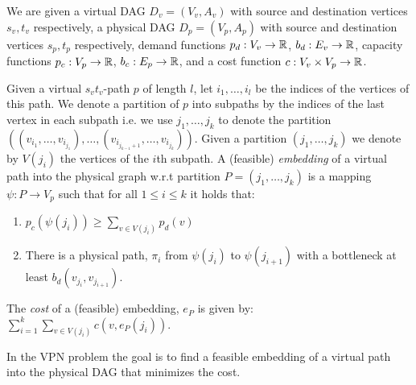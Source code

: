 We are given a virtual DAG $D_v = (V_v, A_v)$ 
with source and destination vertices $s_v, t_v$ respectively, 
a physical DAG $D_p = (V_p, A_p)$
with source and destination vertices $s_p, t_p$ respectively,
demand functions $p_d : V_v \to \mathbb{R}$, $b_d : E_v \to \mathbb{R}$,
capacity functions $p_c : V_p \to \mathbb{R}$, $b_c : E_p \to \mathbb{R}$,
and a cost function $c: V_v \times V_p \to \mathbb{R}$. 

Given a virtual $s_vt_v$-path $p$ of length $l$,
let $i_1, \ldots, i_l$ be the indices of the vertices of this path.
We denote a partition of $p$ into subpaths by the indices of the last vertex in
each subpath i.e. we use $j_1, \ldots, j_k$ to denote the partition 
$((v_{i_1}, \ldots, v_{i_{j_1}}), \ldots, (v_{i_{j_{k-1} + 1}}, \ldots,
v_{i_{j_k}}))$.
Given a partition $(j_1, \ldots, j_k)$ we denote by $V(j_i)$ the vertices of the
$i$th subpath.
A (feasible) \emph{embedding} of a virtual path into the physical graph 
w.r.t partition $P = (j_1, \ldots,j_k)$ is a mapping $\psi : P \to V_p$ such that
for all $1 \leq i \leq k$ it holds that:
\begin{enumerate}
  \item $p_c(\psi(j_i)) \geq \sum_{v \in V(j_i)} p_d(v)$
  \item There is a physical path, $\pi_i$ from $\psi(j_i)$ to $\psi(j_{i+1})$ with a
  bottleneck at least $b_d(v_{j_i}, v_{j_{i+1}})$.
\end{enumerate}
The \emph{cost} of a (feasible) embedding, $e_P$ is given by:
$\sum_{i = 1}^k \sum_{v \in V(j_i)} c(v, e_P(j_i))$.   

In the  VPN problem the goal is to find a
feasible embedding of a virtual path into the physical DAG that minimizes the
cost.

\begin{figure}[ht]
\centering
\scalebox{1}{

}

\end{figure}
